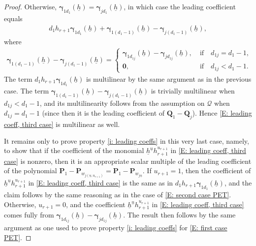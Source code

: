 \documentclass[11pt]{amsart}
\theoremstyle{definition}
\newcommand{\CQ}{{\mathcal Q}}
\newcommand{\p}{{\mathbf{P}}}
\newcommand{\q}{{\mathbf{Q}}}
\newcommand{\bgamma}{{\boldsymbol{\gamma}}}
\newcommand{\uh}{{\underline{h}}}
\newcommand{\uu}{{\underline{u}}}
\begin{document}
\begin{proof}
        Otherwise, $\bgamma_{1 d_1}(\uh)=\bgamma_{jd_1}(\uh)$, in which case the leading coefficient equals 
        \begin{align}\label{E: leading coeff, third case}
            d_1h_{r+1} \bgamma_{1d_1}(\uh) + \bgamma_{1 (d_1-1)}(\uh)-\bgamma_{j(d_1-1)}(\uh),
        \end{align}
        where 
        \begin{align*}
            \bgamma_{1 (d_1-1)}(\uh)-\bgamma_{j(d_1-1)}(\uh) = \begin{cases} \bgamma_{1d_{1j}}(\uh)-\bgamma_{jd_{1j}}(\uh),\; &\textrm{if}\quad d_{1j} = d_1-1,\\
            \mathbf{0},\; &\textrm{if}\quad d_{1j}<d_1-1.
            \end{cases}
        \end{align*}
        The term $d_1h_{r+1} \bgamma_{1d_1}(\uh)$ is multilinear by the same argument as in the previous case.  The term $\bgamma_{1 (d_1-1)}(\uh)-\bgamma_{j(d_1-1)}(\uh)$ is trivially multilinear when $d_{1j}<d_1-1$, and its multilinearity follows from the assumption on $\CQ$ when $d_{1j} = d_1-1$ (since then it is the leading coefficient of $\q_1 - \q_j$). Hence \eqref{E: leading coeff, third case} is multilinear as well. 

        It remains only to prove property \eqref{i: leading coeffs} in this very last case, namely, to show that if the coefficient of the monomial $\uh^\uu h_{r+1}^{u_{r+1}}$ in \eqref{E: leading coeff, third case} is nonzero, then it is an appropriate scalar multiple of the leading coefficient of the polynomial $\p_1 - \p_{w_{j(\uu, u_{r+1})}} = \p_1 - \p_{w_{j\uu}}$. If $u_{r+1}=1$, then the coefficient of $\uh^\uu h_{r+1}^{u_{r+1}}$ in \eqref{E: leading coeff, third case} is the same as in $d_1h_{r+1} \bgamma_{1d_1}(\uh)$, and the claim follows by the same reasoning as in the case of \eqref{E: second case PET}. Otherwise, $u_{r+1}=0$, and the coefficient $\uh^\uu h_{r+1}^{u_{r+1}}$ in \eqref{E: leading coeff, third case} comes fully from $\bgamma_{1d_{1j}}(\uh)-\bgamma_{jd_{1j}}(\uh)$. The result then follows by the same argument as one used to prove property \eqref{i: leading coeffs} for \eqref{E: first case PET}.
    \end{proof}
\end{document}
